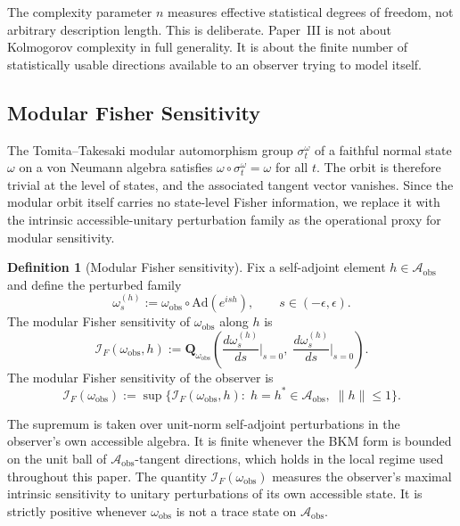 \documentclass[12pt]{article}
\theoremstyle{definition}
\newtheorem{definition}[theorem]{Definition}
\theoremstyle{remark}
\begin{document}
The complexity parameter \(n\) measures effective statistical degrees of
freedom, not arbitrary description length. This is deliberate. Paper~III
is not about Kolmogorov complexity in full generality. It is about the
finite number of statistically usable directions available to an
observer trying to model itself.

\subsection{Modular Fisher Sensitivity}\label{subsec:2.1b}

The Tomita--Takesaki modular automorphism group
\(\sigma_t^\omega\) of a faithful normal state \(\omega\) on a von
Neumann algebra satisfies \(\omega\circ\sigma_t^\omega=\omega\) for
all \(t\). The orbit is therefore trivial at the level of states, and
the associated tangent vector vanishes. Since the modular orbit itself
carries no state-level Fisher information, we replace it with the
intrinsic accessible-unitary perturbation family as the operational
proxy for modular sensitivity.

\begin{definition}[Modular Fisher sensitivity]\label{def:2.1b}
Fix a self-adjoint element
\(h\in\mathcal{A}_{\mathrm{obs}}\) and define the perturbed family
\[
\omega_s^{(h)}
:=
\omega_{\mathrm{obs}}\circ\mathrm{Ad}(e^{ish}),
\qquad s\in(-\epsilon,\epsilon).
\]
The modular Fisher sensitivity of
\(\omega_{\mathrm{obs}}\) along \(h\) is
\[
\mathcal{I}_F(\omega_{\mathrm{obs}},h)
:=
\mathbf{Q}_{\omega_{\mathrm{obs}}}\!\left(
\frac{d\omega_s^{(h)}}{ds}\bigg|_{s=0},\;
\frac{d\omega_s^{(h)}}{ds}\bigg|_{s=0}
\right).
\]
The modular Fisher sensitivity of the observer is
\[
\mathcal{I}_F(\omega_{\mathrm{obs}})
:=
\sup\bigl\{
\mathcal{I}_F(\omega_{\mathrm{obs}},h)
:\;
h=h^*\in\mathcal{A}_{\mathrm{obs}},\;
\|h\|\le 1
\bigr\}.
\]
\end{definition}

The supremum is taken over unit-norm self-adjoint perturbations in the
observer's own accessible algebra. It is finite whenever the BKM form
is bounded on the unit ball of
\(\mathcal{A}_{\mathrm{obs}}\)-tangent directions, which holds in the
local regime used throughout this paper. The quantity
\(\mathcal{I}_F(\omega_{\mathrm{obs}})\) measures the observer's
maximal intrinsic sensitivity to unitary perturbations of its own
accessible state. It is strictly positive whenever
\(\omega_{\mathrm{obs}}\) is not a trace state on
\(\mathcal{A}_{\mathrm{obs}}\).
\end{document}

